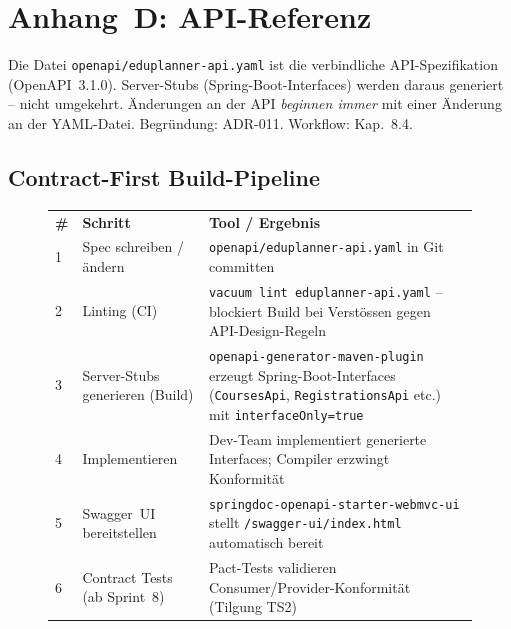 
\section{Anhang~D: API-Referenz}
\label{sec:anhang-openapi}

\begin{hinweis}
  Die Datei \texttt{openapi/}\allowbreak \texttt{eduplanner-}\allowbreak \texttt{api.yaml} ist die verbindliche
  API-Spezifikation (OpenAPI~3.1.0). Server-Stubs (Spring-Boot-Interfaces)
  werden daraus generiert -- nicht umgekehrt. Änderungen an der API
  \emph{beginnen immer} mit einer Änderung an der YAML-Datei.
  Begründung: ADR-011. Workflow: Kap.~8.4.
\end{hinweis}

\subsection*{Contract-First Build-Pipeline}

\begin{figure}[H]
  \centering
  \begin{tabularx}{\textwidth}{C{0.6cm} L{3.8cm} X}
  \color{white}\textbf{\#} &
  \color{white}\textbf{Schritt} &
  \color{white}\textbf{Tool / Ergebnis} \\
  1 & Spec schreiben / ändern &
  \texttt{openapi/}\allowbreak \texttt{eduplanner-}\allowbreak \texttt{api.yaml} in Git committen \\
  2 & Linting (CI) &
  \texttt{vacuum lint eduplanner-}\allowbreak \texttt{api.yaml} -- blockiert Build
  bei Verstössen gegen API-Design-Regeln \\
  3 & Server-Stubs generieren (Build) &
  \texttt{openapi-}\allowbreak \texttt{generator-}\allowbreak \texttt{maven-}\allowbreak \texttt{plugin} erzeugt
  Spring-Boot-Interfaces (\texttt{CoursesApi},
  \texttt{RegistrationsApi} etc.) mit
  \texttt{interfaceOnly=true} \\
  4 & Implementieren &
  Dev-Team implementiert generierte Interfaces;
  Compiler erzwingt Konformität \\
  5 & Swagger~UI bereitstellen &
  \texttt{springdoc-}\allowbreak \texttt{openapi-}\allowbreak \texttt{starter-}\allowbreak \texttt{webmvc-}\allowbreak \texttt{ui} stellt
  \texttt{/swagger-ui/index.html} automatisch bereit \\
  6 & Contract Tests (ab Sprint~8) &
  Pact-Tests validieren Consumer/Provider-Konformität
  (Tilgung TS2) \\
  \end{tabularx}
\end{figure}

